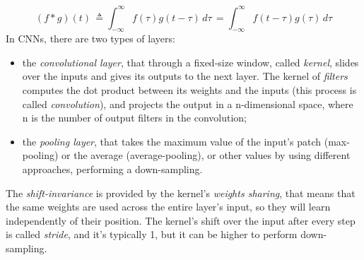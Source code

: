 \[
	(f*g)(t)\,
		\triangleq
	\int_{-\infty }^{\infty} f(\tau)g(t-\tau)\, d\tau\,
		=
	\int_{-\infty }^{\infty} f(t-\tau)g(\tau)\, d\tau
\]
\newline
In CNNs, there are two types of layers:
\begin{itemize}
	\item the \textit{convolutional layer}, that through a fixed-size window, called \textit{kernel}, slides over the inputs and gives its outputs to the next layer. The kernel of \textit{filters} computes the dot product between its weights and the inputs (this process is called \textit{convolution}), and projects the output in a n-dimensional space, where n is the number of output filters in the convolution;
	\item the \textit{pooling layer}, that takes the maximum value of the input's patch (max-pooling) or the average (average-pooling), or other values by using different approaches, performing a down-sampling.
\end{itemize} 
The \textit{shift-invariance} is provided by the kernel's \textit{weights sharing}, that means that the same weights are used across the entire layer's input, so they will learn independently of their position. The kernel's shift over the input after every step is called \textit{stride}, and it's typically 1, but it can be higher to perform down-sampling.
\bigbreak

